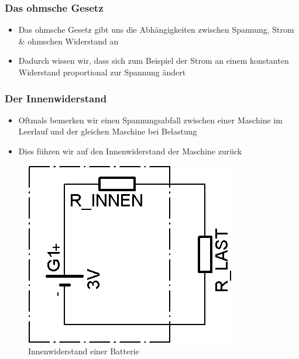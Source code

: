 \begin{frame}
  \frametitle{Das ohmsche Gesetz}
  \begin{itemize}
    \item Das ohmsche Gesetz gibt uns die Abhängigkeiten zwischen Spannung, Strom \& ohmschen Widerstand an
    \item Dadurch wissen wir, dass sich zum Beispiel der Strom an einem konstanten Widerstand proportional zur Spannung ändert
  \end{itemize}
\end{frame}

\begin{frame}
  \frametitle{Der Innenwiderstand}
  \begin{itemize}
    \item Oftmals bemerken wir einen Spannungsabfall zwischen einer Maschine im Leerlauf und der gleichen Maschine bei Belastung
    \item Dies führen wir auf den Innenwiderstand der Maschine zurück
  \end{itemize}
  \begin{center}
    \begin{figure}
      \includegraphics[width=\textwidth,height=.5\textheight,keepaspectratio]{e03/Innenwiderstand.png}
      \caption{Innenwiderstand einer Batterie}
    \end{figure}
  \end{center}
\end{frame}

